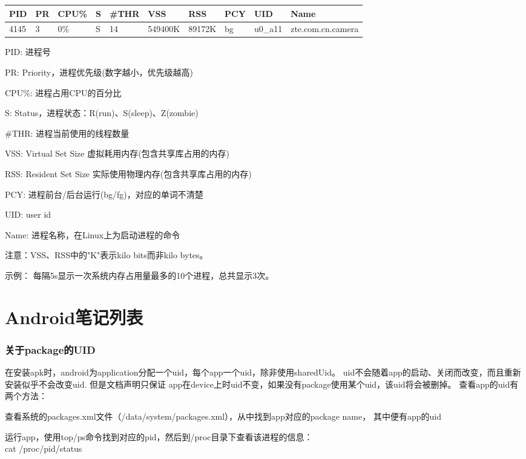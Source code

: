 ﻿\documentclass[a4paper,11pt]{article}
\begin{document}
  \begin{center}
  \begin{tabular}{llllllllll}
    PID & PR & CPU\% & S & \#THR & VSS & RSS & PCY & UID & Name\\ \hline
    4145 & 3 & 0\% & S & 14 & 549400K & 89172K & bg & u0\_a11 & zte.com.cn.camera
  \end{tabular}
  \end{center}
  \begin{coloredenumerate}
    \item PID: 进程号
    \item PR: Priority，进程优先级(数字越小，优先级越高)
    \item CPU\%: 进程占用CPU的百分比
    \item S: Status，进程状态：R(run)、S(sleep)、Z(zombie)
    \item \#THR: 进程当前使用的线程数量
    \item VSS: Virtual Set Size 虚拟耗用内存(包含共享库占用的内存)
    \item RSS: Resident Set Size 实际使用物理内存(包含共享库占用的内存)
    \item PCY: 进程前台/后台运行(bg/fg)，对应的单词不清楚
    \item UID: user id
    \item Name: 进程名称，在Linux上为启动进程的命令
  \end{coloredenumerate}
  注意：VSS、RSS中的"K"表示kilo bits而非kilo bytes。\par
  示例：
  每隔5s显示一次系统内存占用量最多的10个进程，总共显示3次。


  \part[Android Notes List]{Android笔记列表}
  \section[关于package的UID]{关于package的UID}
  在安装apk时，android为application分配一个uid，每个app一个uid，除非使用sharedUid。
	uid不会随着app的启动、关闭而改变，而且重新安装似乎不会改变uid. 但是文档声明只保证
	app在device上时uid不变，如果没有package使用某个uid，该uid将会被删掉。
	查看app的uid有两个方法：
  \begin{coloredenumerate}
    \item 查看系统的packages.xml文件（/data/system/packages.xml），从中找到app对应的package name，
		      其中便有app的uid
    \item 运行app，使用top/ps命令找到对应的pid，然后到/proc目录下查看该进程的信息：\\
      		cat /proc/\lt pid\gt/status
  \end{coloredenumerate}
\end{document}
